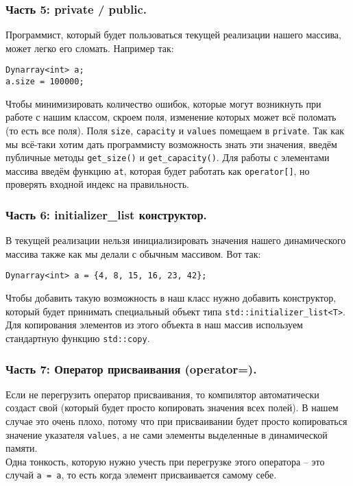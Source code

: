 \documentclass{article}
\begin{document}
\subsubsection*{Часть 5: private / public.}
Программист, который будет пользоваться текущей реализации нашего массива, может легко его сломать. Например так:
\begin{lstlisting}
Dynarray<int> a;
a.size = 100000;
\end{lstlisting}
Чтобы минимизировать количество ошибок, которые могут возникнуть при работе с нашим классом, скроем поля, изменение которых может всё поломать (то есть все поля). Поля \texttt{size}, \texttt{capacity} и \texttt{values} помещаем в \texttt{private}. Так как мы всё-таки хотим дать программисту возможность знать эти значения, введём публичные методы \texttt{get\_size()} и \texttt{get\_capacity()}. Для работы с элементами массива введём функцию \texttt{at}, которая будет работать как \texttt{operator[]}, но проверять входной индекс на правильность.
\subsubsection*{Часть 6: initializer\_list конструктор.}
В текущей реализации нельзя инициализировать значения нашего динамического массива также как мы делали с обычным массивом. Вот так:
\begin{lstlisting}
Dynarray<int> a = {4, 8, 15, 16, 23, 42};
\end{lstlisting}
Чтобы добавить такую возможность в наш класс нужно добавить конструктор, который будет принимать специальный объект типа \texttt{std::initializer\_list<T>}. Для копирования элементов из этого объекта в наш массив используем стандартную функцию \texttt{std::copy}.
\subsubsection*{Часть 7: Оператор присваивания (operator=).}
Если не перегрузить оператор присваивания, то компилятор автоматически создаст свой (который будет просто копировать значения всех полей). В нашем случае это очень плохо, потому что при присваивании будет просто копироваться значение указателя \texttt{values}, а не сами элементы выделенные в динамической памяти. \\
Одна тонкость, которую нужно учесть при перегрузке этого оператора -- это случай \texttt{a = a}, то есть когда элемент присваивается самому себе.
\end{document}
